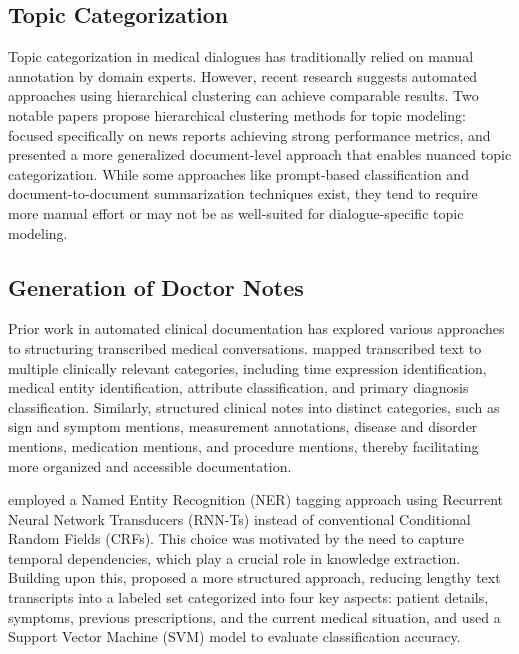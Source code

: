 \documentclass[11pt,a4paper]{article}
\begin{document}
\subsection*{Topic Categorization}
Topic categorization in medical dialogues has traditionally relied on manual annotation by domain experts. 
However, recent research suggests automated approaches using hierarchical clustering can achieve comparable results. 
Two notable papers propose hierarchical clustering methods for topic modeling: \cite{kapoor2024qualitativeinsightstoolqualit} focused specifically on news reports achieving strong performance metrics, and \cite{khandelwal2025usingllmbasedapproachesenhance} presented a more generalized document-level approach that enables nuanced topic categorization.
While some approaches like prompt-based classification and document-to-document summarization techniques exist, they tend to require more manual effort or may not be as well-suited for dialogue-specific topic modeling.

\subsection*{Generation of Doctor Notes}
Prior work in automated clinical documentation has explored various approaches to structuring transcribed medical conversations. \cite{wenceslao} mapped transcribed text to multiple clinically relevant categories, including time expression identification, medical entity identification, attribute classification, and primary diagnosis classification. Similarly, \cite{khattak} structured clinical notes into distinct categories, such as sign and symptom mentions, measurement annotations, disease and disorder mentions, medication mentions, and procedure mentions, thereby facilitating more organized and accessible documentation. 

\cite{understandingmedicalconvo} employed a Named Entity Recognition (NER) tagging approach using Recurrent Neural Network Transducers (RNN-Ts) instead of conventional Conditional Random Fields (CRFs). This choice was motivated by the need to capture temporal dependencies, which play a crucial role in knowledge extraction. 
Building upon this, \cite{dlbasedtranscribing} proposed a more structured approach, reducing lengthy text transcripts into a labeled set categorized into four key aspects: patient details, symptoms, previous prescriptions, and the current medical situation, and used a Support Vector Machine (SVM) model to evaluate classification accuracy.
\end{document}
